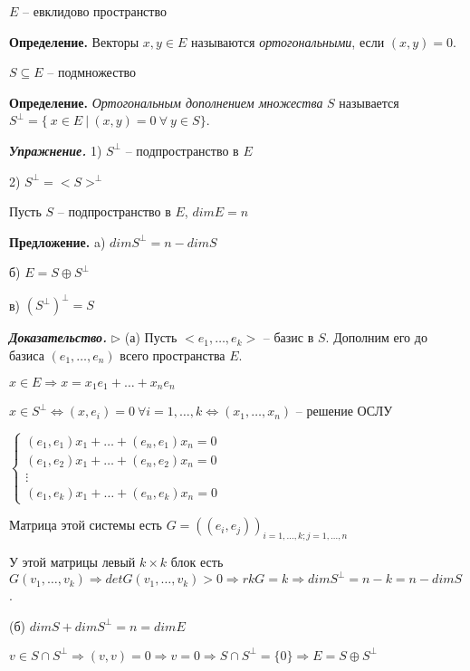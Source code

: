\vspace{\baselineskip}
$E$ -- евклидово пространство

\textbf{Определение.} Векторы $x, y \in E$ называются \textit{ортогональными}, если $(x, y) = 0$.

\vspace{\baselineskip}
$S \subseteq E$ -- подмножество

\textbf{Определение.} \textit{Ортогональным дополнением множества} $S$ называется $S^{\bot} = \{ \ x \in E \ | \ (x, y) = 0 \ \forall \ y \in S \}$.

\vspace{\baselineskip}
\textbf{\textit{Упражнение.}} 1) $S^{\bot}$ -- подпространство в $E$

2) $S^{\bot} = <S>^{\bot}$

\vspace{\baselineskip}
Пусть $S$ -- подпространство в $E$, $dimE = n$

\textbf{Предложение.} a) $dimS^{\bot} = n - dimS$

б) $E = S \oplus S^{\bot}$

в) $(S^{\bot})^{\bot} = S$

\vspace{\baselineskip}
\textbf{\textit{Доказательство.}} $\rhd$ (а) Пусть $<e_1, \dots, e_k>$  -- базис в $S$. Дополним его до базиса $(e_1, \dots, e_n)$ всего пространства $E$.

$x \in E \Rightarrow x = x_1 e_1 + \dots + x_n e_n$

$x \in S^{\bot} \Leftrightarrow (x, e_i) = 0 \ \forall i = 1, \dots, k \Leftrightarrow (x_1, \dots, x_n)$ -- решение ОСЛУ

$\begin{cases}
(e_1, e_1) x_1 + \dots + (e_n, e_1) x_n = 0 \\
(e_1, e_2) x_1 + \dots + (e_n, e_2) x_n = 0 \\
\vdots \\
(e_1, e_k) x_1 + \dots + (e_n, e_k) x_n = 0
\end{cases}$

Матрица этой системы есть $G = ((e_i, e_j))_{i=1, \dots, k; j = 1, \dots, n}$

У этой матрицы левый $k \times k$ блок есть $G(v_1, \dots, v_k) \Rightarrow det G(v_1, \dots, v_k) > 0 \Rightarrow rkG = k \Rightarrow dim S^{\bot} = n - k = n - dimS$.

(б) $dimS + dim S^{\bot} = n = dimE$

$v \in S \cap S^{\bot} \Rightarrow (v, v) = 0 \Rightarrow v = 0 \Rightarrow S \cap S^{\bot} = \{0\} \Rightarrow E = S \oplus S^{\bot}$

